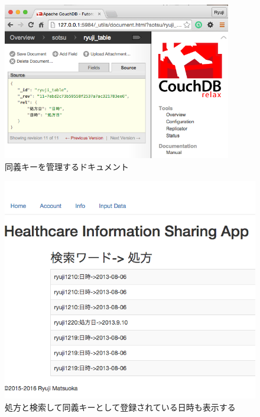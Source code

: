 		\begin{figure}[htbp]
			\begin{center}
				\includegraphics[width=10cm, bb=0 0 609 478, clip]{./gazou/relation2.png}
			\end{center}
			\caption{同義キーを管理するドキュメント}
			\label{relation}
		\end{figure}

		\begin{figure}[htbp]
			\begin{center}
				\includegraphics[width=15cm, bb=0 0 609 528, clip]{./gazou/relationApp3.png}
			\end{center}
			\caption{処方と検索して同義キーとして登録されている日時も表示する}
			\label{relationApp}
		\end{figure}




